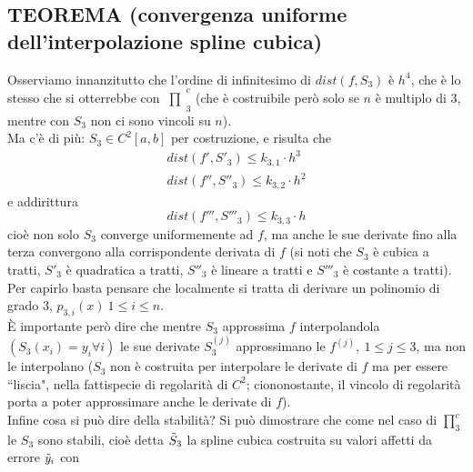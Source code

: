 \documentclass[12pt,a4paper]{article}
\newcommand{\inter}{\begin{matrix}\prod\end{matrix}}
\begin{document}
\subsection{TEOREMA (convergenza uniforme dell'interpolazione spline cubica)}
\begin{center}
\end{center}
Osserviamo innanzitutto che l'ordine di infinitesimo di $dist(f, S_3)$ è $h^4$, che è lo stesso che si otterrebbe con $\inter_3^c$ (che è costruibile però solo se $n$ è multiplo di 3, mentre con $S_3$ non ci sono vincoli su $n$).\\
Ma c'è di più: $S_3 \in C^2 [a,b]$ per costruzione, e risulta che
\[
\begin{split}
    dist(f', S'_3) \leq k_{3,1} \cdot h^3 \\
    dist(f'', S''_3) \leq k_{3,2} \cdot h^2
\end{split}
\]
e addirittura
\[
dist(f''', S'''_3) \leq k_{3,3} \cdot h
\]
cioè non solo $S_3$ converge uniformemente ad $f$, ma anche le sue derivate fino alla terza convergono alla corrispondente derivata di $f$ (si noti che $S_3$ è cubica a tratti, $S'_3$ è quadratica a tratti, $S''_3$ è lineare a tratti e $S'''_3$ è costante a tratti).\\
Per capirlo basta pensare che localmente si tratta di derivare un polinomio di grado 3, $p_{3,i} (x) \ 1 \leq i \leq n$.\\
È importante però dire che mentre $S_3$ approssima $f$ interpolandola $(S_3 (x_i) = y_i \forall i)$ le sue derivate $S_3^{(j)}$ approssimano le $f^{(j)}, \ 1 \leq j \leq 3$, ma non le interpolano ($S_3$ non è costruita per interpolare le derivate di $f$ ma per essere ``liscia", nella fattispecie di regolarità di $C^2$; ciononostante, il vincolo di regolarità porta a poter approssimare anche le derivate di $f$).\\
Infine cosa si può dire della stabilità? Si può dimostrare che come nel caso di $\prod_3^c$ le $S_3$ sono stabili, cioè detta $\Tilde{S}_3$ la spline cubica costruita su valori affetti da errore $\Tilde{y}_i$ con 
\end{document}
